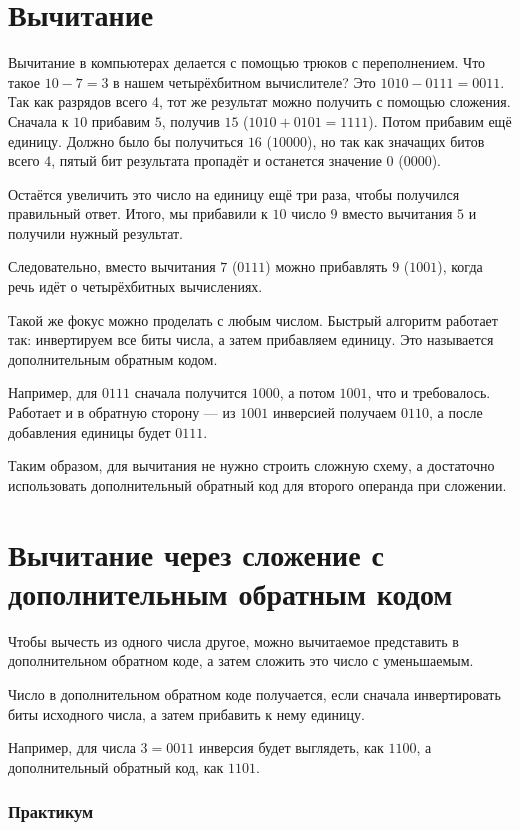 \section{Вычитание}

Вычитание в компьютерах делается с помощью трюков с переполнением.
Что такое $10-7=3$ в нашем четырёхбитном вычислителе?
Это $1010-0111=0011$. Так как разрядов всего $4$, тот же результат
можно получить с помощью сложения. Сначала к $10$ прибавим $5$, получив $15$
($1010+0101=1111$). Потом прибавим ещё единицу. Должно было бы получиться
$16$ ($10000$), но так как значащих битов всего $4$, пятый бит результата
пропадёт и останется значение $0$ ($0000$).

Остаётся увеличить это число на единицу ещё три раза, чтобы получился
правильный ответ. Итого, мы прибавили к $10$ число $9$ вместо вычитания $5$
и получили нужный результат.

Следовательно, вместо вычитания $7$ ($0111$) можно прибавлять $9$ ($1001$),
когда речь идёт о четырёхбитных вычислениях.

Такой же фокус можно проделать с любым числом. Быстрый алгоритм работает так:
инвертируем все биты числа, а затем прибавляем единицу. Это называется
дополнительным обратным кодом.

Например, для $0111$ сначала получится $1000$, а потом $1001$, что и требовалось.
Работает и в обратную сторону --- из $1001$ инверсией получаем $0110$,
а после добавления единицы будет $0111$.

Таким образом, для вычитания не нужно строить сложную схему, а достаточно
использовать дополнительный обратный код для второго операнда при сложении.

\section{Вычитание через сложение с дополнительным обратным кодом}

Чтобы вычесть из одного числа другое, можно вычитаемое представить в дополнительном обратном
коде, а затем сложить это число с уменьшаемым.

Число в дополнительном обратном коде получается, если сначала инвертировать биты исходного
числа, а затем прибавить к нему единицу.

Например, для числа $3=0011$ инверсия будет выглядеть, как $1100$, а дополнительный обратный код, как $1101$.

\subsubsection{Практикум}

